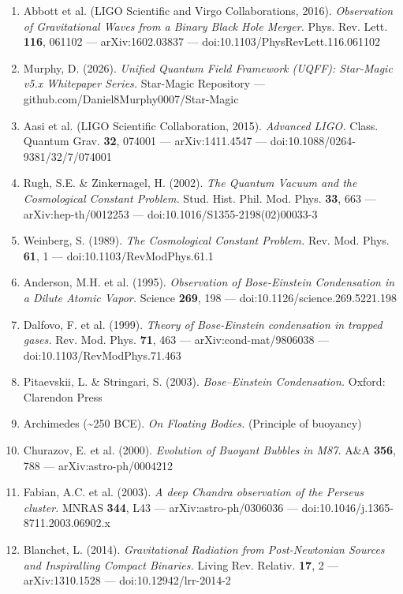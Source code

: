 \documentclass[12pt,a4paper]{article}
\begin{document}
\begin{enumerate}
  \item Abbott et al. (LIGO Scientific and Virgo Collaborations, 2016). \emph{Observation of Gravitational Waves from a Binary Black Hole Merger.} Phys. Rev. Lett. \textbf{116}, 061102 --- arXiv:1602.03837 --- doi:10.1103/PhysRevLett.116.061102
  \item Murphy, D. (2026). \emph{Unified Quantum Field Framework (UQFF): Star-Magic v5.x Whitepaper Series.} Star-Magic Repository --- github.com/Daniel8Murphy0007/Star-Magic
  \item Aasi et al. (LIGO Scientific Collaboration, 2015). \emph{Advanced LIGO.} Class. Quantum Grav. \textbf{32}, 074001 --- arXiv:1411.4547 --- doi:10.1088/0264-9381/32/7/074001
  \item Rugh, S.E. \& Zinkernagel, H. (2002). \emph{The Quantum Vacuum and the Cosmological Constant Problem.} Stud. Hist. Phil. Mod. Phys. \textbf{33}, 663 --- arXiv:hep-th/0012253 --- doi:10.1016/S1355-2198(02)00033-3
  \item Weinberg, S. (1989). \emph{The Cosmological Constant Problem.} Rev. Mod. Phys. \textbf{61}, 1 --- doi:10.1103/RevModPhys.61.1
  \item Anderson, M.H. et al. (1995). \emph{Observation of Bose-Einstein Condensation in a Dilute Atomic Vapor.} Science \textbf{269}, 198 --- doi:10.1126/science.269.5221.198
  \item Dalfovo, F. et al. (1999). \emph{Theory of Bose-Einstein condensation in trapped gases.} Rev. Mod. Phys. \textbf{71}, 463 --- arXiv:cond-mat/9806038 --- doi:10.1103/RevModPhys.71.463
  \item Pitaevskii, L. \& Stringari, S. (2003). \emph{Bose--Einstein Condensation.} Oxford: Clarendon Press
  \item Archimedes (\textasciitilde{}250 BCE). \emph{On Floating Bodies.} (Principle of buoyancy)
  \item Churazov, E. et al. (2000). \emph{Evolution of Buoyant Bubbles in M87.} A\&A \textbf{356}, 788 --- arXiv:astro-ph/0004212
  \item Fabian, A.C. et al. (2003). \emph{A deep Chandra observation of the Perseus cluster.} MNRAS \textbf{344}, L43 --- arXiv:astro-ph/0306036 --- doi:10.1046/j.1365-8711.2003.06902.x
  \item Blanchet, L. (2014). \emph{Gravitational Radiation from Post-Newtonian Sources and Inspiralling Compact Binaries.} Living Rev. Relativ. \textbf{17}, 2 --- arXiv:1310.1528 --- doi:10.12942/lrr-2014-2
\end{enumerate}
\end{document}
